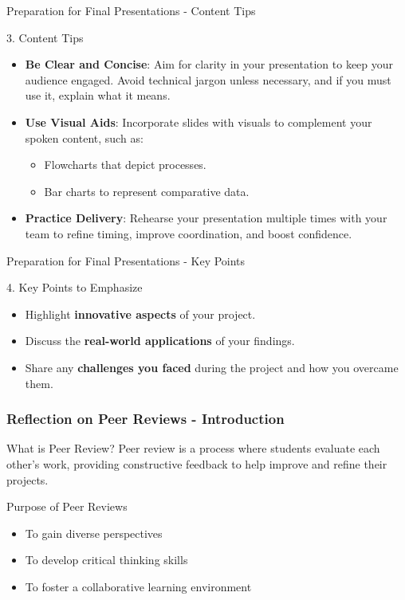 \documentclass[aspectratio=169]{beamer}
\begin{document}
\begin{frame}[fragile]{Preparation for Final Presentations - Content Tips}
    \begin{block}{3. Content Tips}
        \begin{itemize}
            \item \textbf{Be Clear and Concise}: Aim for clarity in your presentation to keep your audience engaged. Avoid technical jargon unless necessary, and if you must use it, explain what it means.
            \item \textbf{Use Visual Aids}: Incorporate slides with visuals to complement your spoken content, such as:
            \begin{itemize}
                \item Flowcharts that depict processes.
                \item Bar charts to represent comparative data.
            \end{itemize}
            \item \textbf{Practice Delivery}: Rehearse your presentation multiple times with your team to refine timing, improve coordination, and boost confidence.
        \end{itemize}
    \end{block}
\end{frame}

\begin{frame}[fragile]{Preparation for Final Presentations - Key Points}
    \begin{block}{4. Key Points to Emphasize}
        \begin{itemize}
            \item Highlight \textbf{innovative aspects} of your project.
            \item Discuss the \textbf{real-world applications} of your findings.
            \item Share any \textbf{challenges you faced} during the project and how you overcame them.
        \end{itemize}
    \end{block}
\end{frame}

\begin{frame}[fragile]
    \frametitle{Reflection on Peer Reviews - Introduction}
    \begin{block}{What is Peer Review?}
        Peer review is a process where students evaluate each other’s work, providing constructive feedback to help improve and refine their projects.
    \end{block}
    
    \begin{block}{Purpose of Peer Reviews}
        \begin{itemize}
            \item To gain diverse perspectives
            \item To develop critical thinking skills
            \item To foster a collaborative learning environment
        \end{itemize}
    \end{block}
\end{frame}
\end{document}
